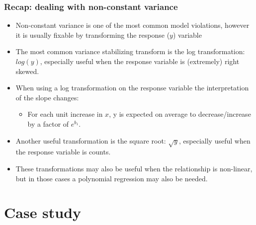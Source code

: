 \documentclass[slidestop,compress,mathserif,12pt,t,professionalfonts,xcolor=table]{beamer}
\begin{document}
\begin{frame}
\frametitle{Recap: dealing with non-constant variance}

\begin{itemize}

\item Non-constant variance is one of the most common model violations, however it is usually fixable by transforming the response ($y$) variable

\pause

\item The most common variance stabilizing transform is the log transformation: $log(y)$, especially useful when the response variable is (extremely) right skewed.

\pause

\item When using a log transformation on the response variable the interpretation of the slope changes: \pause
\begin{itemize}
\item For each unit increase in $x$, y is expected on average to decrease/increase by a factor of $e^{b_1}$.
\end{itemize}

\pause

\item Another useful transformation is the square root: $\sqrt{y}$, especially useful when the response variable is counts.

\pause

\item These transformations may also be useful when the relationship is non-linear, but in those cases a polynomial regression may also be needed.

\end{itemize}

\end{frame}


\section{Case study}

\end{document}
